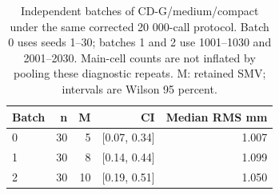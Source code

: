 \begin{table}[H]
\caption{Independent batches of CD-G/medium/compact under the same corrected 20 000-call protocol. Batch 0 uses seeds 1--30; batches 1 and 2 use 1001--1030 and 2001--2030. Main-cell counts are not inflated by pooling these diagnostic repeats. M: retained SMV; intervals are Wilson 95 percent.}
\label{tab:v2_repetition}
\centering
\small
\begin{tabular}{@{}lrrrr@{}}
\toprule
Batch & n & M & CI & Median RMS mm \\
\midrule
0 & 30 & 5 & [0.07, 0.34] & 1.007 \\
1 & 30 & 8 & [0.14, 0.44] & 1.099 \\
2 & 30 & 10 & [0.19, 0.51] & 1.050 \\
\bottomrule
\end{tabular}
\end{table}
